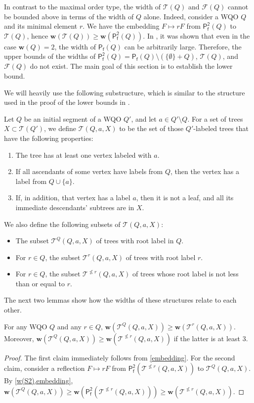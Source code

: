 \documentclass[runningheads]{llncs}
\let \nleq \nleqslant
\let \geq \geqslant
\renewcommand \S [1][]{\mathsf{P_f^{#1}}}
\def \T {\mathcal{T}}
\def \F {\mathcal{F}}
\def \w {\textbf{w}}
\begin{document}
In contrast to the maximal order type, the width of $\T(Q)$ and $\F(Q)$ cannot be bounded above in terms of the width of $Q$ alone. Indeed, consider a WQO $Q$ and its minimal element $r$. We have the embedding $F \mapsto rF$ from $\S[2](Q)$ to $\T(Q)$, hence $\w(\T(Q)) \geq \w(\S[2](Q))$. In \cite[example 3.7]{Abriola2023}, it was shown that even in the case $\w(Q) = 2$, the width of $\S(Q)$ can be arbitrarily large. Therefore, the upper bounds of the widths of $\S[2](Q) = \S(Q) \setminus (\{\emptyset\} + Q)$, $\T(Q)$, and $\F(Q)$ do not exist. The main goal of this section is to establish the lower bound.

We will heavily use the following substructure, which is similar to the structure used in the proof of the lower bounds in \cite{Selivanov2025}.
\begin{definition}\label{w rec tree}
    Let $Q$ be an initial segment of a WQO $Q'$, and let $a \in Q' \setminus Q$. For a set of trees $X \subset \T(Q')$, we define $\T(Q, a, X)$ to be the set of those $Q'$-labeled trees that have the following properties:
    \begin{enumerate}
        \item The tree has at least one vertex labeled with $a$.
        \item If all ascendants of some vertex have labels from $Q$, then the vertex has a label from $Q \cup \{a\}$.
        \item If, in addition, that vertex has a label $a$, then it is not a leaf, and all its immediate descendants' subtrees are in $X$.
    \end{enumerate}
\end{definition}

We also define the following subsets of $\T(Q, a, X)$:
\begin{itemize}
    \item The subset $\T^Q(Q, a, X)$ of trees with root label in $Q$.
    \item For $r \in Q$, the subset $\T^r(Q, a, X)$ of trees with root label $r$.
    \item For $r \in Q$, the subset $\T^{\nleq r}(Q, a, X)$ of trees whose root label is not less than or equal to $r$.
\end{itemize}

The next two lemmas show how the widths of these structures relate to each other.

\begin{lemma}\label{restrict the root}
    For any WQO $Q$ and any $r \in Q$, $\w(\T^Q(Q, a, X)) \geq \w(\T^r(Q, a, X))$. Moreover, $\w(\T^Q(Q, a, X)) \geq \w(\T^{\nleq r}(Q, a, X))$ if the latter is at least $3$.
\end{lemma}
\begin{proof}
    The first claim immediately follows from \cref{embedding}. For the second claim, consider a reflection $F \mapsto rF$ from $\S[2](\T^{\nleq r}(Q, a, X))$ to $\T^Q(Q, a, X)$. By \cref{w(S2),embedding}, $\w(\T^Q(Q, a, X)) \geq \w(\S[2](\T^{\nleq r}(Q, a, X))) \geq \w(\T^{\nleq r}(Q, a, X))$.
\end{proof}
\end{document}
